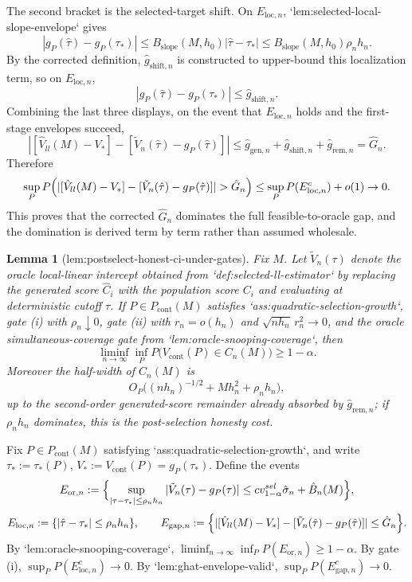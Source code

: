 \documentclass{article}
\newtheorem{lemma}{Lemma}
\begin{document}
The second bracket is the selected-target shift. On \(E_{\mathrm{loc},n}\), `lem:selected-local-slope-envelope` gives
\[
|g_P(\hat\tau)-g_P(\tau_*)|\le B_{\mathrm{slope}}(M,h_0)|\hat\tau-\tau_*|\le B_{\mathrm{slope}}(M,h_0)\rho_n h_n.
\]
By the corrected definition, \(\hat g_{\mathrm{shift},n}\) is constructed to upper-bound this localization term, so on \(E_{\mathrm{loc},n}\),
\[
|g_P(\hat\tau)-g_P(\tau_*)|\le \hat g_{\mathrm{shift},n}.
\]
Combining the last three displays, on the event that \(E_{\mathrm{loc},n}\) holds and the first-stage envelopes succeed,
\[
|[\hat V_{ll}(M)-V_*]-[\tilde V_n(\hat\tau)-g_P(\hat\tau)]|
\le \hat g_{\mathrm{gen},n}+\hat g_{\mathrm{shift},n}+\hat g_{\mathrm{rem},n}
=\hat G_n.
\]
Therefore
\[
\sup_P P\Bigl(|[\hat V_{ll}(M)-V_*]-[\tilde V_n(\hat\tau)-g_P(\hat\tau)]|>\hat G_n\Bigr)
\le \sup_P P(E_{\mathrm{loc},n}^c)+o(1)\to 0.
\]
This proves that the corrected \(\hat G_n\) dominates the full feasible-to-oracle gap, and the domination is derived term by term rather than assumed wholesale.

\begin{lemma}[lem:postselect-honest-ci-under-gates]\label{lem:postselect-honest-ci-under-gates}
Fix \(M\). Let \(\tilde V_n(\tau)\) denote the oracle local-linear intercept obtained from `def:selected-ll-estimator` by replacing the generated score \(\hat C_i\) with the population score \(C_i\) and evaluating at deterministic cutoff \(\tau\). If \(P\in P_{\mathrm{cont}}(M)\) satisfies `ass:quadratic-selection-growth`, gate (i) with \(\rho_n\downarrow 0\), gate (ii) with \(r_n=o(h_n)\) and \(\sqrt{n h_n}\,r_n^2\to 0\), and the oracle simultaneous-coverage gate from `lem:oracle-snooping-coverage`, then
\[
\liminf_{n\to\infty}\inf_P P\bigl(V_{\mathrm{cont}}(P)\in C_n(M)\bigr)\ge 1-\alpha.
\]
Moreover the half-width of \(C_n(M)\) is
\[
O_P\bigl((n h_n)^{-1/2}+M h_n^2+\rho_n h_n\bigr),
\]
up to the second-order generated-score remainder already absorbed by \(\hat g_{\mathrm{rem},n}\); if \(\rho_n h_n\) dominates, this is the post-selection honesty cost.
\end{lemma}
Fix \(P\in P_{\mathrm{cont}}(M)\) satisfying `ass:quadratic-selection-growth`, and write \(\tau_*:=\tau_*(P)\), \(V_*:=V_{\mathrm{cont}}(P)=g_P(\tau_*)\). Define the events
\[
E_{\mathrm{or},n}:=\Bigl\{\sup_{|\tau-\tau_*|\le \rho_n h_n}|\tilde V_n(\tau)-g_P(\tau)|\le cv_{1-\alpha}^{sel}\hat\sigma_n+\hat B_n(M)\Bigr\},
\]
\[
E_{\mathrm{loc},n}:=\{|\hat\tau-\tau_*|\le \rho_n h_n\},\qquad
E_{\mathrm{gap},n}:=\Bigl\{|[\hat V_{ll}(M)-V_*]-[\tilde V_n(\hat\tau)-g_P(\hat\tau)]|\le \hat G_n\Bigr\}.
\]
By `lem:oracle-snooping-coverage`, \(\liminf_{n\to\infty}\inf_P P(E_{\mathrm{or},n})\ge 1-\alpha\). By gate (i), \(\sup_P P(E_{\mathrm{loc},n}^c)\to 0\). By `lem:ghat-envelope-valid`, \(\sup_P P(E_{\mathrm{gap},n}^c)\to 0\).
\end{document}
